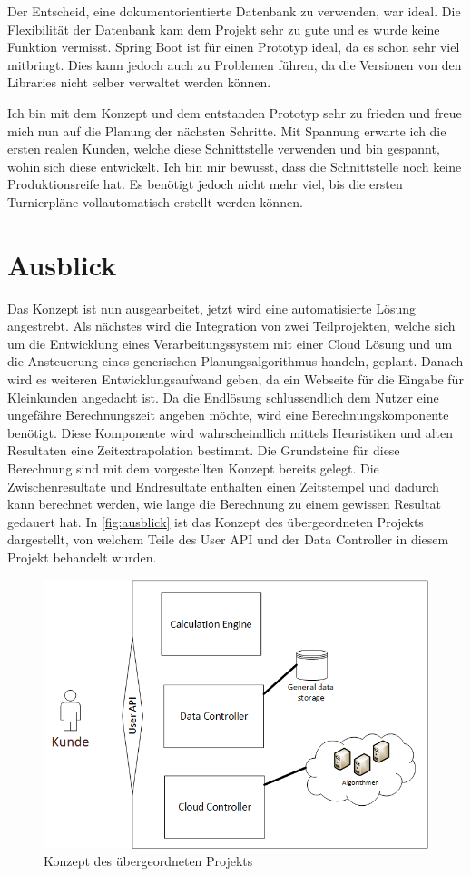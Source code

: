 Der Entscheid, eine dokumentorientierte Datenbank zu verwenden, war ideal. Die Flexibilität der Datenbank kam dem Projekt sehr zu gute und es wurde keine Funktion vermisst. Spring Boot ist für 
einen Prototyp ideal, da es schon sehr viel mitbringt. Dies kann jedoch auch zu Problemen führen, da die Versionen von den Libraries nicht selber verwaltet werden können. 

Ich bin mit dem Konzept und dem entstanden Prototyp sehr zu frieden und freue mich nun auf die Planung der nächsten Schritte. Mit Spannung erwarte ich die ersten realen Kunden, welche diese 
Schnittstelle verwenden und bin gespannt, wohin sich diese entwickelt. Ich bin mir bewusst, dass die Schnittstelle noch keine Produktionsreife hat. Es benötigt jedoch nicht mehr viel, bis die ersten 
Turnierpläne vollautomatisch erstellt werden können.

\section{Ausblick}\label{fazit_ausblick}

Das Konzept ist nun ausgearbeitet, jetzt wird eine automatisierte Lösung angestrebt. Als nächstes wird die Integration von zwei Teilprojekten, welche sich um die Entwicklung eines 
Verarbeitungssystem mit einer Cloud Lösung und um die Ansteuerung eines generischen Planungsalgorithmus handeln, geplant. Danach wird es weiteren Entwicklungsaufwand geben, da ein 
Webseite für die Eingabe für Kleinkunden angedacht ist. Da die Endlösung schlussendlich dem Nutzer eine ungefähre Berechnungszeit angeben möchte, wird eine Berechnungskomponente 
benötigt. Diese Komponente wird wahrscheindlich mittels Heuristiken und alten Resultaten eine Zeitextrapolation bestimmt. Die Grundsteine für diese Berechnung sind mit dem vorgestellten Konzept 
bereits gelegt. Die Zwischenresultate und Endresultate enthalten einen Zeitstempel und dadurch kann berechnet werden, wie lange die Berechnung zu einem gewissen Resultat gedauert hat. In 
\autoref{fig:ausblick} ist das Konzept des übergeordneten Projekts dargestellt, von welchem Teile des User API und der Data Controller in diesem Projekt behandelt wurden.

\begin{figure}[h]
\centering
\includegraphics[scale=0.8]{images/visio/ausblick.png}
\caption[Konzept des übergeordneten Projekts]{Konzept des übergeordneten Projekts \selfmade{}}
\label{fig:ausblick}
\end{figure}